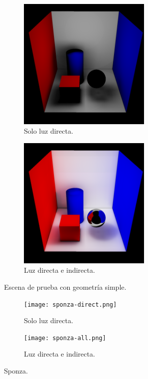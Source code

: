 \begin{figure}[ht]
	\centering
    \begin{subfigure}{1.0\textwidth}
        \centering
		\includegraphics[width=0.7\textwidth]{cornell-box-direct.png}
        \caption{Solo luz directa.}
    \end{subfigure}
    \begin{subfigure}{1.0\textwidth}
        \centering
		\includegraphics[width=0.7\textwidth]{cornell-box-full.png}
        \caption{Luz directa e indirecta.}
    \end{subfigure}
	\caption{Escena de prueba con geometría simple.}
	\label{fig:cornell-box-full}
\end{figure}

\begin{figure}[ht]
	\begin{subfigure}{0.8\textwidth}
		\centering
		\texttt{[image: sponza-direct.png]}
		\caption{Solo luz directa.}
	\end{subfigure}
	\begin{subfigure}{0.8\textwidth}
		\centering
		\texttt{[image: sponza-all.png]}
		\caption{Luz directa e indirecta.}
	\end{subfigure}
	\caption{Sponza.}
	\label{fig:sponza}
\end{figure}

